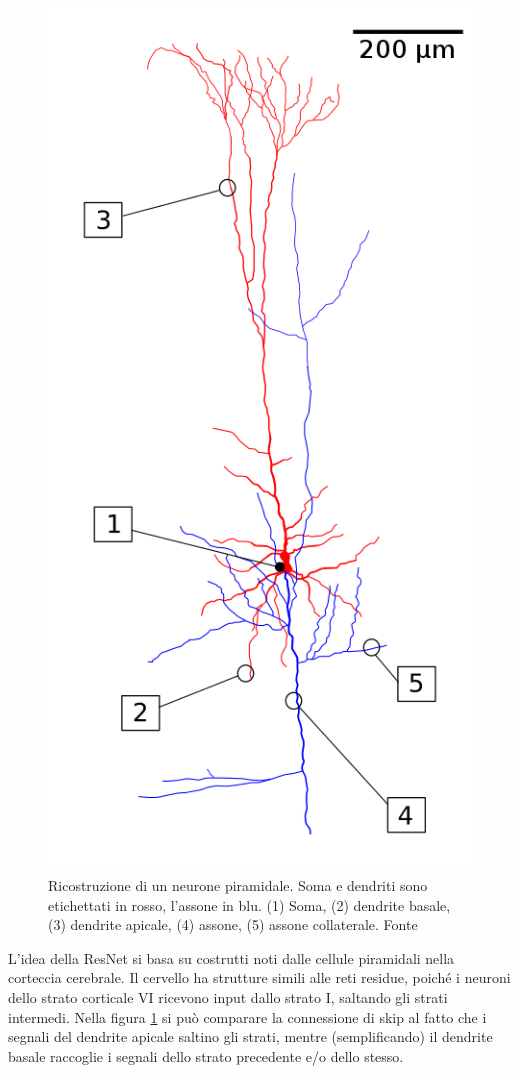 \begin{figure}[!htb]
	\includegraphics[scale=0.25]{images/resnet2.png}
	\caption{Ricostruzione di un neurone piramidale. Soma e dendriti sono etichettati in rosso, l'assone in blu. (1) Soma, (2) dendrite basale, (3) dendrite apicale, (4) assone, (5) assone collaterale. Fonte \cite{resnetWiki}}
	\label{fig:resnet-neurone}
	\endminipage\hfill
\end{figure}

\par L'idea della ResNet si basa su costrutti noti dalle cellule piramidali nella corteccia cerebrale. Il cervello ha strutture simili alle reti residue, poiché i neuroni dello strato corticale VI ricevono input dallo strato I, saltando gli strati intermedi. Nella figura \ref{fig:resnet-neurone} si può comparare la connessione di skip al fatto che i segnali del dendrite apicale saltino gli strati, mentre (semplificando) il dendrite basale raccoglie i segnali dello strato precedente e/o dello stesso. 

